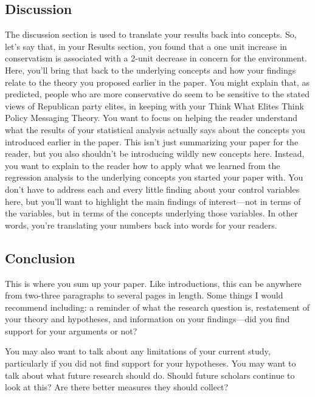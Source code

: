 \documentclass[12pt]{article}
\begin{document}
\hypertarget{discussion}{%
\subsection{Discussion}\label{discussion}}

The discussion section is used to translate your results back into concepts. So, let's say that, in your Results section, you found that a one unit increase in conservatism is associated with a 2-unit decrease in concern for the environment. Here, you'll bring that back to the underlying concepts and how your findings relate to the theory you proposed earlier in the paper. You might explain that, as predicted, people who are more conservative do seem to be sensitive to the stated views of Republican party elites, in keeping with your Think What Elites Think Policy Messaging Theory. You want to focus on helping the reader understand what the results of your statistical analysis actually says about the concepts you introduced earlier in the paper. This isn't just summarizing your paper for the reader, but you also shouldn't be introducing wildly new concepts here. Instead, you want to explain to the reader how to apply what we learned from the regression analysis to the underlying concepts you started your paper with. You don't have to address each and every little finding about your control variables here, but you'll want to highlight the main findings of interest---not in terms of the variables, but in terms of the concepts underlying those variables. In other words, you're translating your numbers back into words for your readers.

\hypertarget{conclusion}{%
\subsection{Conclusion}\label{conclusion}}

This is where you sum up your paper. Like introductions, this can be anywhere from two-three paragraphs to several pages in length. Some things I would recommend including: a reminder of what the research question is, restatement of your theory and hypotheses, and information on your findings---did you find support for your arguments or not?

You may also want to talk about any limitations of your current study, particularly if you did not find support for your hypotheses. You may want to talk about what future research should do. Should future scholars continue to look at this? Are there better measures they should collect?
\end{document}
